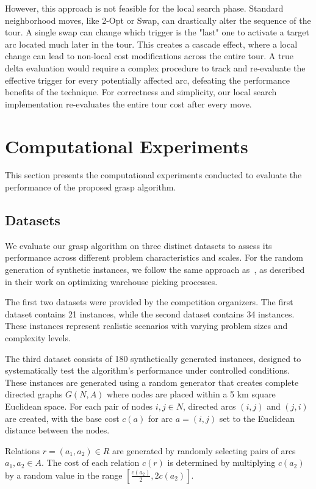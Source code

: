 \documentclass[twocolumn, switch]{article} %
\begin{document}
However, this approach is not feasible for the local search phase. Standard neighborhood moves, like 2-Opt or Swap, can drastically alter the sequence of the tour. A single swap can change which trigger is the "last" one to activate a target arc located much later in the tour. This creates a cascade effect, where a local change can lead to non-local cost modifications across the entire tour. A true delta evaluation would require a complex procedure to track and re-evaluate the effective trigger for every potentially affected arc, defeating the performance benefits of the technique. For correctness and simplicity, our local search implementation re-evaluates the entire tour cost after every move.

\section{Computational Experiments}
This section presents the computational experiments conducted to evaluate the performance of the proposed \gls{grasp} algorithm.

\subsection{Datasets}

We evaluate our \gls{grasp} algorithm on three distinct datasets to assess its performance across different problem characteristics and scales. For the random generation of synthetic instances, we follow the same approach as~\citet{Cerrone}, as described in their work on optimizing warehouse picking processes.

The first two datasets were provided by the competition organizers. The first dataset contains 21 instances, while the second dataset contains 34 instances. These instances represent realistic scenarios with varying problem sizes and complexity levels.

The third dataset consists of 180 synthetically generated instances, designed to systematically test the algorithm's performance under controlled conditions. These instances are generated using a random generator that creates complete directed graphs $G(N,A)$ where nodes are placed within a 5 km square Euclidean space. For each pair of nodes $i, j \in N$, directed arcs $(i, j)$ and $(j, i)$ are created, with the base cost $c(a)$ for arc $a = (i, j)$ set to the Euclidean distance between the nodes.

Relations $r = (a_1, a_2) \in R$ are generated by randomly selecting pairs of arcs $a_1, a_2 \in A$. The cost of each relation $c(r)$ is determined by multiplying $c(a_2)$ by a random value in the range $[\frac{c(a_2)}{2}, 2c(a_2)]$.
\end{document}
